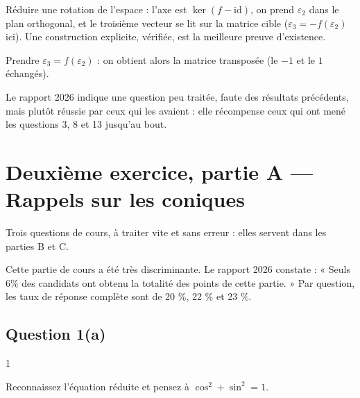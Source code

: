 \documentclass[11pt,a4paper]{article}
\begin{document}
\begin{methode}

Réduire une rotation de l'espace : l'axe est \(\ker(f-\mathrm{id})\), on prend \(\varepsilon_2\) dans le plan orthogonal, et le troisième vecteur se lit sur la matrice cible (\(\varepsilon_3=-f(\varepsilon_2)\) ici). Une construction explicite, vérifiée, est la meilleure preuve d'existence.

\end{methode}

\begin{piege}

Prendre \(\varepsilon_3=f(\varepsilon_2)\) : on obtient alors la matrice transposée (le \(-1\) et le \(1\) échangés).

\end{piege}

\begin{jury}

Le rapport 2026 indique une question peu traitée, faute des résultats précédents, mais plutôt réussie par ceux qui les avaient : elle récompense ceux qui ont mené les questions 3, 8 et 13 jusqu'au bout.

\end{jury}

\hypertarget{deuxiuxe8me-exercice-partie-a-rappels-sur-les-coniques}{%
\section{Deuxième exercice, partie A --- Rappels sur les coniques}\label{deuxiuxe8me-exercice-partie-a-rappels-sur-les-coniques}}

Trois questions de cours, à traiter vite et sans erreur : elles servent dans les parties B et C.

\begin{jury}

Cette partie de cours a été très discriminante. Le rapport 2026 constate : « Seuls 6\% des candidats ont obtenu la totalité des points de cette partie. » Par question, les taux de réponse complète sont de 20 \%, 22 \% et 23 \%.

\end{jury}

\hypertarget{question-1a}{%
\subsection{Question 1(a)}\label{question-1a}}

\begin{indication}{1}

Reconnaissez l'équation réduite et pensez à \(\cos^2+\sin^2=1\).

\end{indication}
\end{document}
